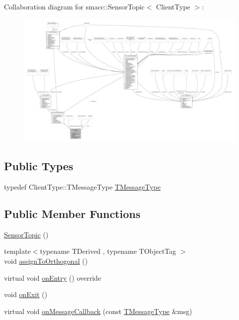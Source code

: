 Collaboration diagram for smacc\+:\+:Sensor\+Topic$<$ Client\+Type $>$\+:
\nopagebreak
\begin{figure}[H]
\begin{center}
\leavevmode
\includegraphics[width=350pt]{classsmacc_1_1SensorTopic__coll__graph}
\end{center}
\end{figure}
\subsection*{Public Types}
\begin{DoxyCompactItemize}
\item 
typedef Client\+Type\+::\+T\+Message\+Type \hyperlink{classsmacc_1_1SensorTopic_a8c57644ed5865162ef19fd5a290d2730}{T\+Message\+Type}
\end{DoxyCompactItemize}
\subsection*{Public Member Functions}
\begin{DoxyCompactItemize}
\item 
\hyperlink{classsmacc_1_1SensorTopic_a3c11e8c6e738cea40c8172b033533bab}{Sensor\+Topic} ()
\item 
{\footnotesize template$<$typename T\+Derived , typename T\+Object\+Tag $>$ }\\void \hyperlink{classsmacc_1_1SensorTopic_a8d736f546d14cad5ed69c3ced3e4e788}{assign\+To\+Orthogonal} ()
\item 
virtual void \hyperlink{classsmacc_1_1SensorTopic_aa18961f866b7427973acb2660c8e39ee}{on\+Entry} () override
\item 
void \hyperlink{classsmacc_1_1SensorTopic_a3d667ad8340bd04a8a6b84eccfebe3f0}{on\+Exit} ()
\item 
virtual void \hyperlink{classsmacc_1_1SensorTopic_ab28b08e1dc643d880ce016f41c60b7b6}{on\+Message\+Callback} (const \hyperlink{classsmacc_1_1SensorTopic_a8c57644ed5865162ef19fd5a290d2730}{T\+Message\+Type} \&msg)
\end{DoxyCompactItemize}
